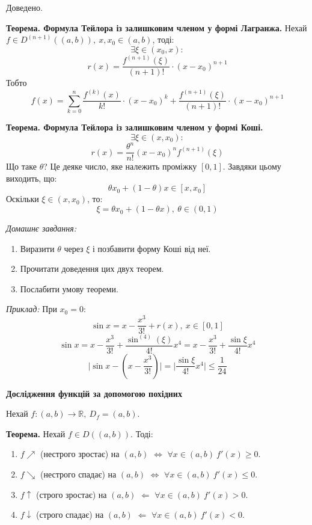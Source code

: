 \documentclass[12pt]{report}
\begin{document}
Доведено.

\vspace{3mm}

\textbf{Теорема. Формула Тейлора із залишковим членом у формі Лагранжа.}
Нехай $f \in D^{(n+1)}((a,b)),\ x,x_0 \in (a,b)$, тоді:
$$\exists \xi \in (x_0, x):$$
$$r(x) = \frac{f^{(n+1)}(\xi)}{(n+1)!}\cdot (x - x_0)^{n+1}$$
Тобто
$$f(x) = \sum_{k = 0}^{n}\frac{f^{(k)}(x)}{k!} \cdot (x-x_0)^k + \frac{f^{(n+1)}(\xi)}{(n+1)!}\cdot (x - x_0)^{n+1}$$

\textbf{Теорема. Формула Тейлора із залишковим членом у формі Коші.}
$$\exists \xi \in (x, x_0):$$
$$r(x) = \frac{\theta^n}{n!}(x - x_0)^n f^{(n+1)}(\xi)$$
Що таке $\theta$? 
Це деяке число, яке належить проміжку $[0,1]$. Завдяки цьому виходить, що:
$$\theta x_0 + (1-\theta)x \in [x, x_0]$$
Оскільки $\xi \in (x, x_0)$, то:
$$\xi = \theta x_0 + (1 - \theta x),\ \theta \in (0,1)$$

\textit{Домашнє завдання:}
\begin{enumerate}
\item Виразити $\theta$ через $\xi$ і позбавити форму Коші від неї.
\item Прочитати доведення цих двух теорем.
\item Послабити умову теореми.
\end{enumerate}

\vspace{3mm}

\textit{Приклад:}
При $x_0 = 0$:
$$\sin x = x - \frac{x^3}{3!} + r(x),\ x \in [0,1]$$
$$\sin x = x - \frac{x^3}{3!} + \frac{\sin^{(4)} (\xi)}{4!} x^4 = x - \frac{x^3}{3!} + \frac{\sin \xi}{4!} x^4$$
$$\Big|\sin x - (x - \frac{x^3}{3!})\Big| = \Big|\frac{\sin \xi}{4!} x^4\Big|\leq \frac{1}{24}$$

\begin{center}
\textbf{Дослідження функцій за допомогою похідних}
\end{center}

Нехай $f : (a,b) \to \mathbb{R},\ D_f = (a,b)$.

\textbf{Теорема.} Нехай $f \in D((a,b))$. Тоді:
\begin{enumerate}
\item $f \nearrow$ (нестрого зростає) на $(a,b)$ $\Longleftrightarrow$ $\forall x \in (a,b)\ f'(x) \geq 0$. 
\item $f \searrow$ (нестрого спадає) на $(a,b)$ $\Longleftrightarrow$ $\forall x \in (a,b)\ f'(x) \leq 0$.
\item $f \uparrow$ (строго зростає) на $(a,b)$ $\Longleftarrow$ $\forall x \in (a,b)\ f'(x) > 0$.
\item $f \downarrow$ (строго спадає) на $(a,b)$ $\Longleftarrow$ $\forall x \in (a,b)\ f'(x) < 0$.
\end{enumerate}
\end{document}
